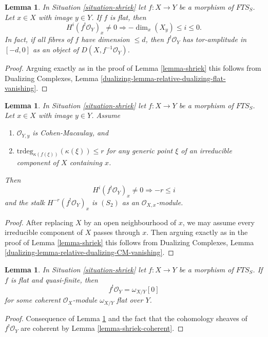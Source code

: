 \documentclass{stacks-project}
\theoremstyle{plain}
\newtheorem{lemma}[subsection]{Lemma}
\theoremstyle{definition}
\theoremstyle{remark}
\numberwithin{equation}{subsection}
\begin{document}
\begin{lemma}
\label{lemma-flat-shriek}
In Situation \ref{situation-shriek} let $f : X \to Y$ be a morphism of
$\textit{FTS}_S$. Let $x \in X$ with image $y \in Y$.
If $f$ is flat, then
$$
H^i(f^!\mathcal{O}_Y)_x \not = 0
\Rightarrow - \dim_x(X_y) \leq i \leq 0.
$$
In fact, if all fibres of $f$ have dimension $\leq d$, then
$f^!\mathcal{O}_Y$ has tor-amplitude in $[-d, 0]$ as an object
of $D(X, f^{-1}\mathcal{O}_Y)$.
\end{lemma}

\begin{proof}
Arguing exactly as in the proof of Lemma \ref{lemma-shriek}
this follows from Dualizing Complexes, Lemma
\ref{dualizing-lemma-relative-dualizing-flat-vanishing}.
\end{proof}

\begin{lemma}
\label{lemma-shriek-over-CM}
In Situation \ref{situation-shriek} let $f : X \to Y$ be a morphism of
$\textit{FTS}_S$. Let $x \in X$ with image $y \in Y$. Assume
\begin{enumerate}
\item $\mathcal{O}_{Y, y}$ is Cohen-Macaulay, and
\item $\text{trdeg}_{\kappa(f(\xi))}(\kappa(\xi)) \leq r$
for any generic point $\xi$ of an irreducible component
of $X$ containing $x$.
\end{enumerate}
Then
$$
H^i(f^!\mathcal{O}_Y)_x \not = 0
\Rightarrow - r \leq i
$$
and the stalk $H^{-r}(f^!\mathcal{O}_Y)_x$ is $(S_2)$ as an
$\mathcal{O}_{X, x}$-module.
\end{lemma}

\begin{proof}
After replacing $X$ by an open neighbourhood of $x$, we may
assume every irreducible component of $X$ passes through $x$.
Then arguing exactly as in the proof of Lemma \ref{lemma-shriek}
this follows from Dualizing Complexes, Lemma
\ref{dualizing-lemma-relative-dualizing-CM-vanishing}.
\end{proof}

\begin{lemma}
\label{lemma-flat-quasi-finite-shriek}
In Situation \ref{situation-shriek} let $f : X \to Y$ be a morphism of
$\textit{FTS}_S$. If $f$ is flat and quasi-finite, then
$$
f^!\mathcal{O}_Y = \omega_{X/Y}[0]
$$
for some coherent $\mathcal{O}_X$-module $\omega_{X/Y}$ flat over $Y$.
\end{lemma}

\begin{proof}
Consequence of Lemma \ref{lemma-flat-shriek} and the fact that the
cohomology sheaves of $f^!\mathcal{O}_Y$ are coherent by
Lemma \ref{lemma-shriek-coherent}.
\end{proof}
\end{document}

